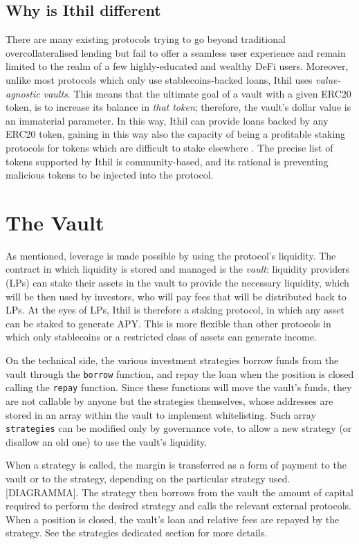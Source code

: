 \documentclass[a4paper,10 pt]{article}
\theoremstyle{definition}
\begin{document}
\subsection{Why is Ithil different}
There are many existing protocols \cite{mediumLending} trying to go beyond traditional overcollateralised lending but fail to offer a seamless user experience and remain limited to the realm of a few highly-educated and wealthy DeFi users. Moreover, unlike most protocols which only use stablecoins-backed loans, Ithil uses {\it value-agnostic vaults}. This means that the ultimate goal of a vault with a given ERC20 token, is to increase its balance in {\it that token}; therefore, the vault's dollar value is an immaterial parameter. In this way, Ithil can provide loans backed by any ERC20 token, gaining in this way also the capacity of being a profitable staking protocols for tokens which are difficult to stake elsewhere \cite{bscShiba}. The precise list of tokens supported by Ithil is community-based, and its rational is preventing malicious tokens to be injected into the protocol.

\section{The Vault}
As mentioned, leverage is made possible by using the protocol's liquidity. The contract in which liquidity is stored and managed is the {\it vault}: liquidity providers (LPs) can stake their assets in the vault to provide the necessary liquidity, which will be then used by investors, who will pay fees that will be distributed back to LPs. At the eyes of LPs, Ithil is therefore a staking protocol, in which any asset can be staked to generate APY. This is more flexible than other protocols \cite{binanceYield} in which only stablecoins or a restricted class of assets can generate income.

On the technical side, the various investment strategies borrow funds from the vault through the \verb|borrow| function, and repay the loan when the position is closed calling the \verb|repay| function. Since these functions will move the vault's funds, they are not callable by anyone but the strategies themselves, whose addresses are stored in an array within the vault to implement whitelisting. Such array \verb|strategies| can be modified only by governance vote, to allow a new strategy (or disallow an old one) to use the vault's liquidity.

When a strategy is called, the margin is transferred as a form of payment to the vault or to the strategy, depending on the particular strategy used. [DIAGRAMMA]. The strategy then borrows from the vault the amount of capital required to perform the desired strategy and calls the relevant external protocols. When a position is closed, the vault's loan and relative fees are repayed by the strategy. See the strategies dedicated section for more details.
\end{document}
